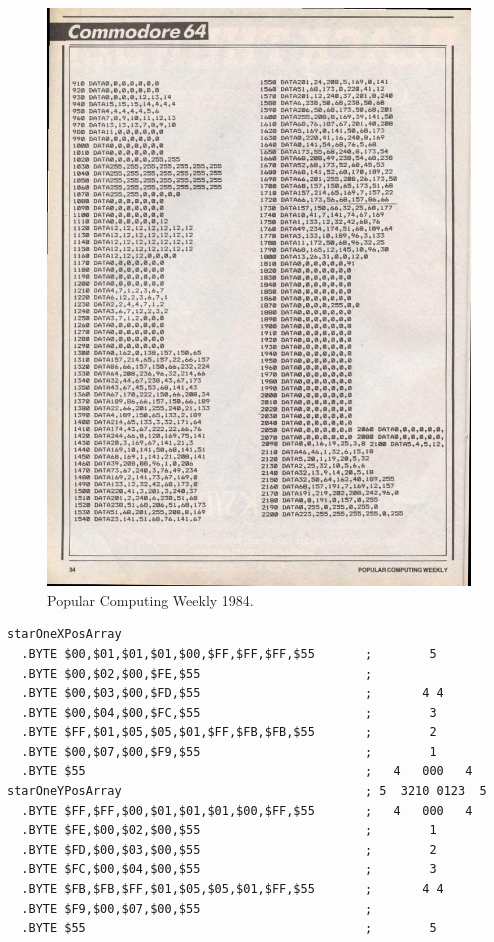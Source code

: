 \begin{figure}[H]
    \centering
    \begin{adjustbox}{width=12cm,center}
      \includegraphics[width=12cm]{src/listing/PopularComputing_Weekly_Issue_1984-12-13_0033.jpg}%
    \end{adjustbox}
\caption{Popular Computing Weekly 1984.}
\end{figure}

\begin{lstlisting}[caption=Source code for the Star.]
starOneXPosArray  
  .BYTE $00,$01,$01,$01,$00,$FF,$FF,$FF,$55       ;        5       
  .BYTE $00,$02,$00,$FE,$55                       ;                
  .BYTE $00,$03,$00,$FD,$55                       ;       4 4      
  .BYTE $00,$04,$00,$FC,$55                       ;        3       
  .BYTE $FF,$01,$05,$05,$01,$FF,$FB,$FB,$55       ;        2       
  .BYTE $00,$07,$00,$F9,$55                       ;        1       
  .BYTE $55                                       ;   4   000   4  
starOneYPosArray                                  ; 5  3210 0123  5  
  .BYTE $FF,$FF,$00,$01,$01,$01,$00,$FF,$55       ;   4   000   4  
  .BYTE $FE,$00,$02,$00,$55                       ;        1       
  .BYTE $FD,$00,$03,$00,$55                       ;        2       
  .BYTE $FC,$00,$04,$00,$55                       ;        3       
  .BYTE $FB,$FB,$FF,$01,$05,$05,$01,$FF,$55       ;       4 4      
  .BYTE $F9,$00,$07,$00,$55                       ;                
  .BYTE $55                                       ;        5       
\end{lstlisting}

